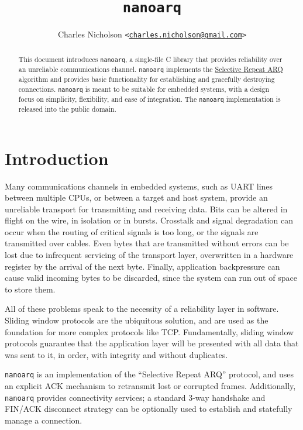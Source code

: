 \documentclass[11pt]{article}
\newcommand{\nanoarq}{\texttt{nanoarq}}
\begin{document}
\title{\nanoarq{}}
\author{Charles Nicholson \texttt{<\href{mailto:charles.nicholson@gmail.com}{charles.nicholson@gmail.com}>}}
\maketitle

\begin{abstract}
    This document introduces \nanoarq{}, a single-file C library that provides reliability over an unreliable communications channel. \nanoarq{} implements the \href{https://en.wikipedia.org/wiki/Selective_Repeat_ARQ}{Selective Repeat ARQ}   algorithm and provides basic functionality for establishing and gracefully destroying connections. \nanoarq{} is meant to be suitable for embedded systems, with a design focus on simplicity, flexibility, and ease of integration. The \nanoarq{} implementation is released into the public domain.
\end{abstract}

\section{Introduction}
Many communications channels in embedded systems, such as UART lines between multiple CPUs, or between a target and host system, provide an unreliable transport for transmitting and receiving data. Bits can be altered in flight on the wire, in isolation or in bursts. Crosstalk and signal degradation can occur when the routing of critical signals is too long, or the signals are transmitted over cables. Even bytes that are transmitted without errors can be lost due to infrequent servicing of the transport layer, overwritten in a hardware register by the arrival of the next byte. Finally, application backpressure can cause valid incoming bytes to be discarded, since the system can run out of space to store them. \par
All of these problems speak to the necessity of a reliability layer in software. Sliding window protocols are the ubiquitous solution, and are used as the foundation for more complex protocols like TCP. Fundamentally, sliding window protocols guarantee that the application layer will be presented with all data that was sent to it, in order, with integrity and without duplicates. \par
\nanoarq{} is an implementation of the \enquote{Selective Repeat ARQ} protocol, and uses an explicit ACK mechanism to retransmit lost or corrupted frames. Additionally, \nanoarq{} provides connectivity services; a standard 3-way handshake and FIN/ACK disconnect strategy can be optionally used to establish and statefully manage a connection.
\end{document}
